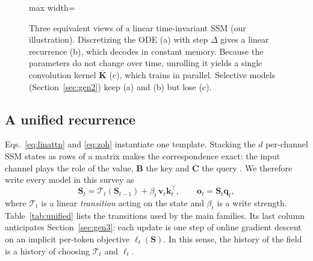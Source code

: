 \documentclass[a4paper]{article}
\newcommand{\T}{^{\top}}
\newcommand{\vq}{\mathbf{q}}
\newcommand{\vk}{\mathbf{k}}
\newcommand{\vv}{\mathbf{v}}
\newcommand{\vy}{\mathbf{y}}
\newcommand{\vu}{\mathbf{u}}
\newcommand{\vo}{\mathbf{o}}
\newcommand{\mB}{\mathbf{B}}
\newcommand{\mC}{\mathbf{C}}
\newcommand{\mS}{\mathbf{S}}
\newcommand{\Ab}{\overline{\mathbf{A}}}
\newcommand{\Bb}{\overline{\mathbf{B}}}
\newcommand{\Kb}{\overline{\mathbf{K}}}
\newcommand{\bigO}{\mathcal{O}}
\theoremstyle{plain}
\theoremstyle{remark}
\begin{document}
\begin{figure}[t]
\begin{adjustbox}{max width=\textwidth}
\end{adjustbox}
\caption{\label{fig:views}Three equivalent views of a linear time-invariant SSM (our illustration). Discretizing the ODE (a) with step $\Delta$ gives a linear recurrence (b), which decodes in constant memory. Because the parameters do not change over time, unrolling it yields a single convolution kernel $\Kb$ (c), which trains in parallel. Selective models (Section~\ref{sec:gen2}) keep (a) and (b) but lose (c).}
\end{figure}

\subsection{A unified recurrence}
\label{sec:unified}
Eqs.~\eqref{eq:linattn} and \eqref{eq:zoh} instantiate one template. Stacking the $d$ per-channel SSM states as rows of a matrix makes the correspondence exact: the input channel plays the role of the value, $\mB$ the key and $\mC$ the query \citep{dao2024ssd}. We therefore write every model in this survey as
\begin{equation}
\label{eq:unified}
\mS_t=\mathcal{T}_t(\mS_{t-1})+\beta_t\,\vv_t\vk_t\T,\qquad \vo_t=\mS_t\vq_t,
\end{equation}
where $\mathcal{T}_t$ is a linear \emph{transition} acting on the state and $\beta_t$ is a write strength. Table~\ref{tab:unified} lists the transitions used by the main families. Its last column anticipates Section~\ref{sec:gen3}: each update is one step of online gradient descent on an implicit per-token objective $\ell_t(\mS)$. In this sense, the history of the field is a history of choosing $\mathcal{T}_t$ and $\ell_t$.
\end{document}
